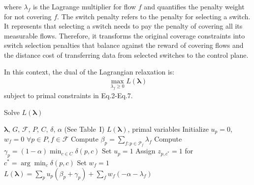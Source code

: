 \noindent where $\lambda_f$ is the Lagrange multiplier for flow $f$ and quantifies the penalty weight for not covering $f$. The switch penalty refers to the penalty for selecting a switch. It represents that selecting a switch needs to pay the penalty of covering all its measurable flows. Therefore, it transforms the original coverage constraints into switch selection penalties that balance against the reward of covering flows and the distance cost of transferring data from selected switches to the control plane. 

In this context, the dual of the Lagrangian relaxation is:
\begin{align}
\max_{\lambda_f \geq 0} L(\boldsymbol{\lambda}) 
\end{align}
subject to primal constraints in Eq.2-Eq.7. 

\begin{algorithm}[t]
\caption{Solve \( L(\boldsymbol{\lambda}) \)}
\label{alg:solve-lagrangian}
\begin{algorithmic}[1]
\footnotesize
\Require \(\boldsymbol{\lambda}\), \(G\), \(\mathcal{F}\), \(P\), \(C\), \(\delta\), \(\alpha\) (See Table~I)
\Ensure \(L(\boldsymbol{\lambda})\), primal variables
\State Initialize \(u_p = 0\), \(w_f = 0\) \(\forall p \in P, f \in \mathcal{F}\)
  \State Compute \(\beta_p = \sum_{f: p \in \mathcal{P}_f} \lambda_f\) 
  \State Compute \(\gamma_p = (1-\alpha) \min_{c \in C} \delta(p, c)\) 
   
    \State Set \(u_p = 1\)
    \State Assign \(z_{p,c^*} = 1\) for \(c^* = \arg\min_c \delta(p,c)\)
  \EndIf
\EndFor
{}
   
    \State Set \(w_f = 1\) 
  \EndIf
\EndFor
\State \Return \(L(\boldsymbol{\lambda}) = \sum_p u_p (\beta_p + \gamma_p) + \sum_f w_f (-\alpha - \lambda_f)\)
\end{algorithmic}
\end{algorithm}

